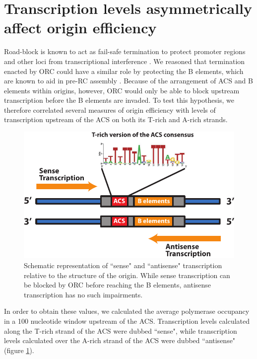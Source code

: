 \singlespacing
\section{Transcription levels asymmetrically affect origin efficiency}
\doublespacing

Road-block is known to act as fail-safe termination to protect promoter regions and other loci from transcriptional interference \cite{colin:2014:roadblock}. 
We reasoned that termination enacted by ORC could have a similar role by protecting the B elements, which are known to aid in pre-RC assembly \cite{wilmes:2002:b2}. 
Because of the arrangement of ACS and B elements within origins, however, ORC would only be able to block upstream transcription before the B elements are invaded. To test this hypothesis, we therefore correlated several measures of origin efficiency with levels of transcription upstream of the ACS on both its T-rich and A-rich strands. 
\begin{figure}[h]

\centering
\includegraphics[width=\textwidth]{figures/results/senseAntisenseSchema}
\caption[Cartoon of sense and antisense transcription relative to the ACS]{Schematic representation of ``sense" and ``antisense" transcription relative to the structure of the origin. While sense transcription can be blocked by ORC before reaching the B elements, antisense transcription has no such impairments.}
\label{fig:senseAntisense}

\end{figure}  
In order to obtain these values, we calculated the average polymerase occupancy in a 100 nucleotide window upstream of the ACS. Transcription levels calculated along the T-rich strand of the ACS were dubbed ``sense", while transcription levels calculated over the A-rich strand of the ACS were dubbed ``antisense" (figure \ref{fig:senseAntisense}).



